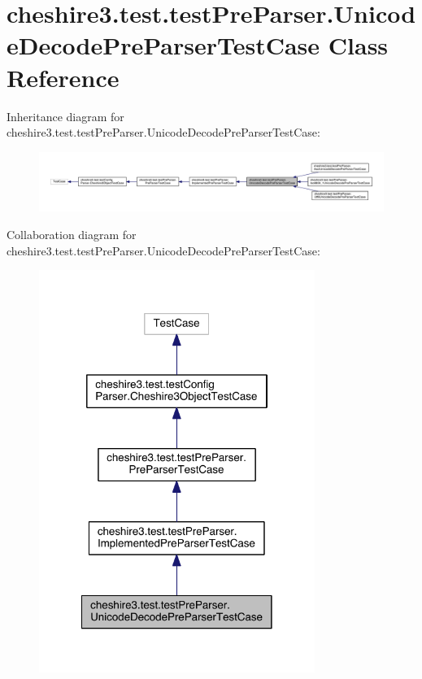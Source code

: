 \hypertarget{classcheshire3_1_1test_1_1test_pre_parser_1_1_unicode_decode_pre_parser_test_case}{\section{cheshire3.\-test.\-test\-Pre\-Parser.\-Unicode\-Decode\-Pre\-Parser\-Test\-Case Class Reference}
\label{classcheshire3_1_1test_1_1test_pre_parser_1_1_unicode_decode_pre_parser_test_case}
}


Inheritance diagram for cheshire3.\-test.\-test\-Pre\-Parser.\-Unicode\-Decode\-Pre\-Parser\-Test\-Case\-:
\nopagebreak
\begin{figure}[H]
\begin{center}
\leavevmode
\includegraphics[width=350pt]{classcheshire3_1_1test_1_1test_pre_parser_1_1_unicode_decode_pre_parser_test_case__inherit__graph}
\end{center}
\end{figure}


Collaboration diagram for cheshire3.\-test.\-test\-Pre\-Parser.\-Unicode\-Decode\-Pre\-Parser\-Test\-Case\-:
\nopagebreak
\begin{figure}[H]
\begin{center}
\leavevmode
\includegraphics[width=254pt]{classcheshire3_1_1test_1_1test_pre_parser_1_1_unicode_decode_pre_parser_test_case__coll__graph}
\end{center}
\end{figure}
